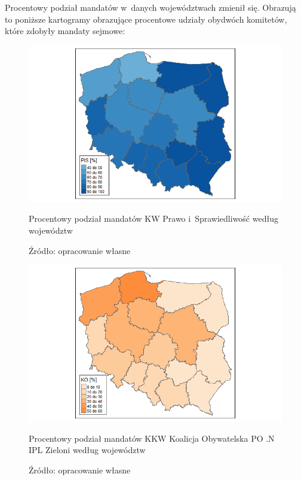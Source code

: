 Procentowy podział mandatów w~danych województwach zmienił się. Obrazują to poniższe kartogramy obrazujące procentowe udziały obydwóch komitetów, które zdobyły mandaty sejmowe:

\begin{figure}[H]
    \centering
    \includegraphics[width=1\textwidth]{rozdzial3/pis_proc_1.jpg}
    \caption{Procentowy podział mandatów KW Prawo i~Sprawiedliwość według województw}
    \caption*{Źródło: opracowanie własne}
    \label{fig:my_label}

    \centering
    \includegraphics[width=1\textwidth]{rozdzial3/ko_proc_1.jpg}
    \caption{Procentowy podział mandatów KKW Koalicja Obywatelska PO .N IPL Zieloni według województw}
    \caption*{Źródło: opracowanie własne}
    \label{fig:my_label}
\end{figure}




